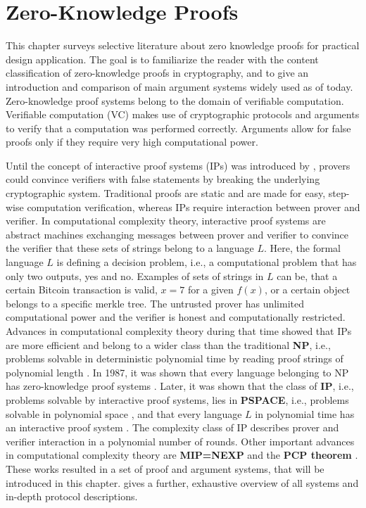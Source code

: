 \chapter{Zero-Knowledge Proofs}
This chapter surveys selective literature about zero knowledge proofs for practical design application. The goal is to familiarize the reader with the content classification of zero-knowledge proofs in cryptography, and to give an introduction and comparison of main argument systems widely used as of today. Zero-knowledge proof systems belong to the domain of verifiable computation. Verifiable computation (VC) makes use of cryptographic protocols and arguments to verify that a computation was performed correctly. Arguments allow for false proofs only if they require very high computational power. 

Until the concept of interactive proof systems (IPs) was introduced by \citet{GoldwasserIPs}, provers could convince verifiers with false statements by breaking the underlying cryptographic system. Traditional proofs are static and are made for easy, step-wise computation verification, whereas IPs require interaction between prover and verifier. In computational complexity theory, interactive proof systems are abstract machines exchanging messages between prover and verifier to convince the verifier that these sets of strings belong to a language \(L\). Here, the formal language \(L\) is defining a decision problem, i.e., a computational problem that has only two outputs, yes and no. Examples of sets of strings in \(L\) can be, that a certain Bitcoin transaction is valid, \(x = 7\) for a given \(f(x)\), or a certain object belongs to a specific merkle tree. The untrusted prover has unlimited computational power and the verifier is honest and computationally restricted. Advances in computational complexity theory during that time showed that IPs are more efficient and belong to a wider class than the traditional \textbf{NP}, i.e., problems solvable in deterministic polynomial time by reading proof strings of polynomial length \citep{SassonIOPsinproceedings}. In 1987, it was shown that every language belonging to NP has zero-knowledge proof systems \citep{anymental10.1145/28395.28420}. Later, it was shown that the class of \textbf{IP}, i.e., problems solvable by interactive proof systems, lies in \textbf{PSPACE}, i.e., problems solvable in polynomial space \citep{Shamir10.1145/146585.146609}, and that every language \(L\) in polynomial time has an interactive proof system \citep{Lund10.1145/146585.146605}. The complexity class of IP describes prover and verifier interaction in a polynomial number of rounds. Other important advances in computational complexity theory are \textbf{MIP=NEXP} \citep{Laszlo} and the \textbf{PCP theorem} \citep{PCPTheorem10.1145/278298.278306}. These works resulted in a set of proof and argument systems, that will be introduced in this chapter. \citet{Thaler} gives a further, exhaustive overview of all systems and in-depth protocol descriptions. 

